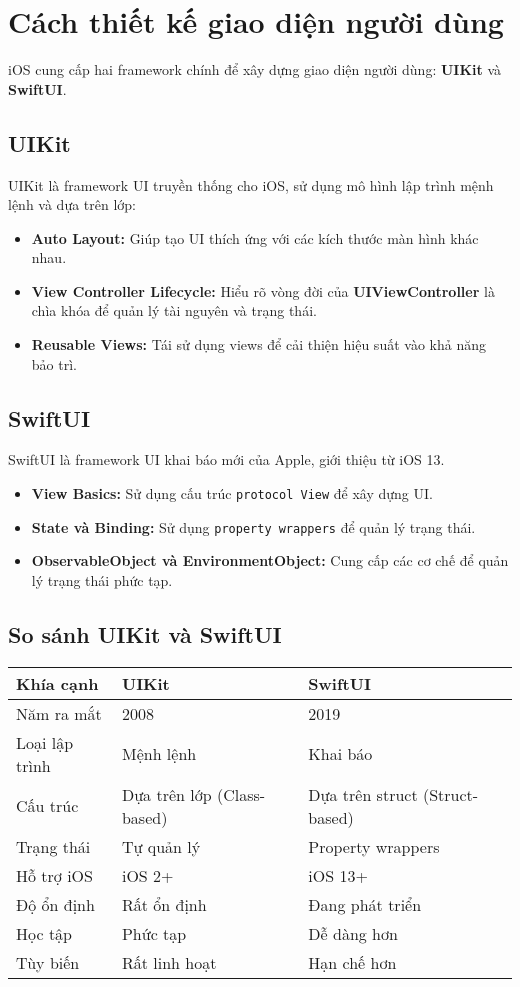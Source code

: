 \section{Cách thiết kế giao diện người dùng}
iOS cung cấp hai framework chính để xây dựng giao diện người dùng: \textbf{UIKit} và \textbf{SwiftUI}.

\subsection{UIKit}
UIKit là framework UI truyền thống cho iOS, sử dụng mô hình lập trình mệnh lệnh và dựa trên lớp:
\begin{itemize}
  \item \textbf{Auto Layout:} Giúp tạo UI thích ứng với các kích thước màn hình khác nhau.
  \item \textbf{View Controller Lifecycle:} Hiểu rõ vòng đời của \textbf{UIViewController} là chìa khóa để quản lý tài nguyên và trạng thái.
  \item \textbf{Reusable Views:} Tái sử dụng views để cải thiện hiệu suất vào khả năng bảo trì.
\end{itemize}

\subsection{SwiftUI}
SwiftUI là framework UI khai báo mới của Apple, giới thiệu từ iOS 13.
\begin{itemize}
  \item \textbf{View Basics:} Sử dụng cấu trúc \texttt{protocol View} để xây dựng UI.
  \item \textbf{State và Binding:} Sử dụng \texttt{property wrappers} để quản lý trạng thái.
  \item \textbf{ObservableObject và EnvironmentObject:} Cung cấp các cơ chế để quản lý trạng thái phức tạp.
\end{itemize}

\subsection{So sánh UIKit và SwiftUI}

\begin{center}
\begin{tabular}{|l|l|l|}
\hline
\textbf{Khía cạnh} & \textbf{UIKit} & \textbf{SwiftUI} \\
\hline
Năm ra mắt & 2008 & 2019 \\
\hline
Loại lập trình & Mệnh lệnh & Khai báo \\
\hline
Cấu trúc & Dựa trên lớp (Class-based) & Dựa trên struct (Struct-based) \\
\hline
Trạng thái & Tự quản lý & Property wrappers \\
\hline
Hỗ trợ iOS & iOS 2+ & iOS 13+ \\
\hline
Độ ổn định & Rất ổn định & Đang phát triển \\
\hline
Học tập & Phức tạp & Dễ dàng hơn \\
\hline
Tùy biến & Rất linh hoạt & Hạn chế hơn \\
\hline
\end{tabular}
\end{center}
